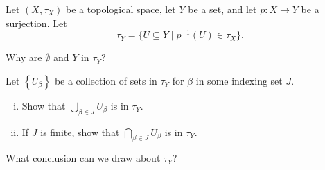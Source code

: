 \begin{activity} \label{act:quot_topology} Let $(X,\tau_X)$ be a topological space, let $Y$ be a set, and let $p: X \to Y$ be a surjection. Let 
\[\tau_Y = \{U \subseteq Y \mid p^{-1}(U) \in \tau_X\}.\]
\ba
\item Why are $\emptyset$ and $Y$ in $\tau_Y$?

\item Let $\left\{U_{\beta}\right\}$ be a collection of sets in $\tau_Y$ for $\beta$ in some indexing set $J$. 
	\begin{enumerate}[i.]
	\item Show that $\bigcup_{\beta \in J} U_{\beta}$ is in $\tau_Y$.
	
	\item If $J$ is finite, show that $\bigcap_{\beta \in J} U_{\beta}$ is in $\tau_Y$.
	
	\end{enumerate}
	
\item What conclusion can we draw about $\tau_Y$? 

\ea

\end{activity}

\begin{comment}

\ActivitySolution

\ba
\item Since $p^{-1}(\emptyset) = \emptyset \in \tau_X$ we have that $\emptyset \in \tau_Y$. The fact that $p$ is a surjection means that $p^{-1}(Y) = X \in \tau_X$. So $Y \in \tau_Y$.

\item Let $\left\{U_{\beta}\right\}$ be a collection of sets in $\tau_Y$ for $\beta$ in some indexing set $J$. 
	\begin{enumerate}[i.]
	\item By definition, $p^{-1}(U_{\beta} \in \tau_X$ for every $\beta \in J$. Since $p^{-1}\left(\bigcup_{\beta \in J} U_{\beta}\right) = \bigcup_{\beta \in J} p^{-1}\left(U_{\alpha}\right)$ is in $\tau_X$ it follows that $\bigcup_{\beta \in J} U_{\beta}$ is in $\tau_Y$.
	
	\item Since $p^{-1}\left(\bigcap_{\beta \in J} U_{\beta}\right) = \bigcap_{\beta \in J} p^{-1}\left(U_{\alpha}\right)$ is in $\tau_X$ it follows that $\bigcap_{\beta \in J} U_{\beta}$ is in $\tau_Y$.
	
	\end{enumerate}
	
\item We can conclude that $\tau_Y$ is a topology on $Y$. 

\ea

\end{comment}

